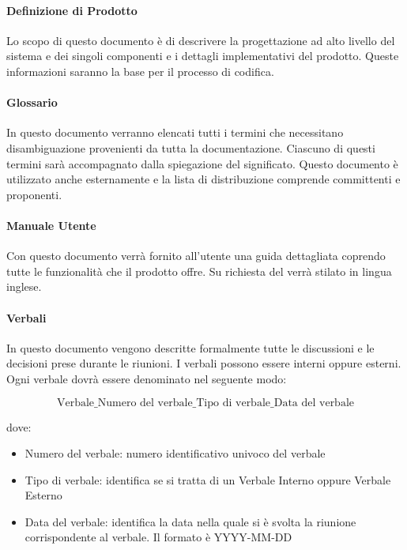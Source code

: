 \paragraph{Definizione di Prodotto  }
Lo scopo di questo documento è di descrivere la progettazione ad alto livello del
sistema e dei singoli componenti e i dettagli implementativi del prodotto.
Queste informazioni saranno la base per il processo di codifica.

\paragraph{Glossario  }
In questo documento verranno elencati tutti i termini
che necessitano disambiguazione provenienti da tutta la documentazione.
Ciascuno di questi termini sarà accompagnato dalla spiegazione del
significato. Questo documento è utilizzato anche esternamente e la
lista di distribuzione comprende committenti e proponenti. 

\paragraph{Manuale Utente  }
Con questo documento verrà fornito all'utente una guida dettagliata coprendo tutte le funzionalità che il prodotto offre.
Su richiesta del  verrà stilato in lingua inglese.


\paragraph{Verbali }
In questo documento vengono descritte formalmente tutte le discussioni
e le decisioni prese durante le riunioni. I verbali possono essere
interni oppure esterni. 
Ogni verbale dovrà essere denominato nel seguente modo: 


$$\text{Verbale}\_\text{Numero del verbale}\_\text{Tipo di verbale}\_\text{Data del verbale} $$

dove:
\begin{itemize}
\item Numero del verbale: numero identificativo univoco del verbale
\item Tipo di verbale: identifica se si tratta di un Verbale Interno oppure Verbale Esterno
\item Data del verbale: identifica la data nella quale si è svolta la riunione corrispondente al verbale. Il formato è YYYY-MM-DD  
\end{itemize}


